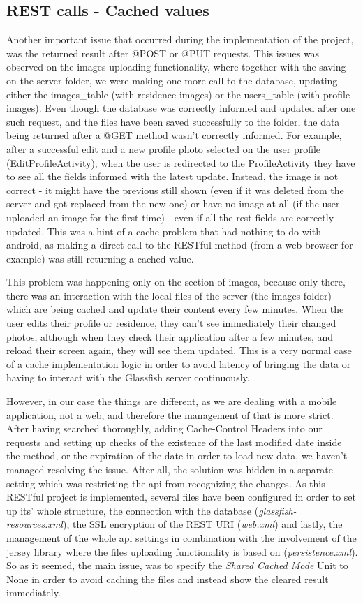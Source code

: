 \documentclass[12pt]{article}
\begin{document}
	\subsection{REST calls - Cached values}
	Another important issue that occurred during the implementation of the project, was the returned result after @POST or @PUT requests. This issues was observed on the images uploading functionality, where together with the saving on the server folder, we were making one more call to the database, updating either the images\_table (with residence images) or the users\_table (with profile images). Even though the database was correctly informed and updated after one such request, and the files have been saved successfully to the folder, the data being returned after a @GET method wasn't correctly informed. For example, after a successful edit and a new profile photo selected on the user profile (EditProfileActivity), when the user is redirected to the ProfileActivity they have to see all the fields informed with the latest update. Instead, the image is not correct - it might have the previous still shown (even if it was deleted from the server and got replaced from the new one) or have no image at all (if the user uploaded an image for the first time) - even if all the rest fields are correctly updated. This was a hint of a cache problem that had nothing to do with android, as making a direct call to the RESTful method (from a web browser for example) was still returning a cached value.
	
	This problem was happening only on the section of images, because only there, there was an interaction with the local files of the server (the images folder) which are being cached and update their content every few minutes. When the user edits their profile or residence, they can't see immediately their changed photos, although when they check their application after a few minutes, and reload their screen again, they will see them updated. This is a very normal case of a cache implementation logic in order to avoid latency of bringing the data or having to interact with the Glassfish server continuously. 
	
	However, in our case the things are different, as we are dealing with a mobile application, not a web, and therefore the management of that is more strict. After having searched thoroughly, adding Cache-Control Headers into our requests and setting up checks of the existence of the last modified date inside the method, or the expiration of the date in order to load new data, we haven't managed resolving the issue. After all, the solution was hidden in a separate setting which was restricting the api from recognizing the changes. As this RESTful project is implemented, several files have been configured in order to set up its' whole structure, the connection with the database (\textit{glassfish-resources.xml}), the SSL encryption of the REST URI (\textit{web.xml}) and lastly, the management of the whole api settings in combination with the involvement of the jersey library where the files uploading functionality is based on (\textit{persistence.xml}). So as it seemed, the main issue, was to specify the \textit{Shared Cached Mode} Unit to None in order to avoid caching the files and instead show the cleared result immediately.
	
\end{document}
